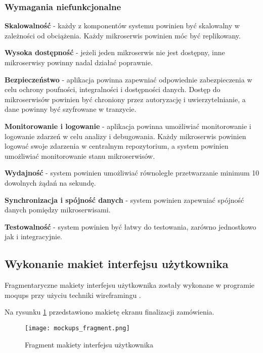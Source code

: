 \subsubsection{Wymagania niefunkcjonalne}


\textbf{Skalowalność} - każdy z komponentów systemu powinien być skalowalny w zależności od obciążenia. Każdy mikroserwis powinien móc być replikowany.

\textbf{Wysoka dostępność} - jeżeli jeden mikroserwis nie jest dostępny, inne mikroserwisy powinny nadal działać poprawnie.

\textbf{Bezpieczeństwo} - aplikacja powinna zapewniać odpowiednie zabezpieczenia w celu ochrony poufności, integralności i dostępności danych. Dostęp do mikroserwisów powinien być chroniony przez autoryzację i uwierzytelnianie, a dane powinny być szyfrowane w tranzycie.

\textbf{Monitorowanie i logowanie} - aplikacja powinna umożliwiać monitorowanie i logowanie zdarzeń w celu analizy i debugowania. Każdy mikroserwis powinien logować swoje zdarzenia w centralnym repozytorium, a system powinien umożliwiać monitorowanie stanu mikroserwisów.

\textbf{Wydajność} - system powinien umożliwiać równoległe przetwarzanie minimum 10 dowolnych żądań na sekundę.

\textbf{Synchronizacja i spójność danych} - system powinien zapewniać spójność danych pomiędzy mikroserwisami.
    
\textbf{Testowalność} - system powinien być łatwy do testowania, zarówno jednostkowo jak i integracyjnie.

\subsection{Wykonanie makiet interfejsu użytkownika}

Fragmentaryczne makiety interfejsu użytkownika zostały wykonane w programie moqups \cite{moqups} przy użyciu techniki wireframingu \cite{wireframing}.

Na rysunku \ref{fig:mockups} przedstawiono makietę ekranu finalizacji zamówienia.

\begin{figure}[!h]
    \centering \texttt{[image: mockups\_fragment.png]}
    \caption{Fragment makiety interfejsu użytkownika}
    \label{fig:mockups}
\end{figure}
